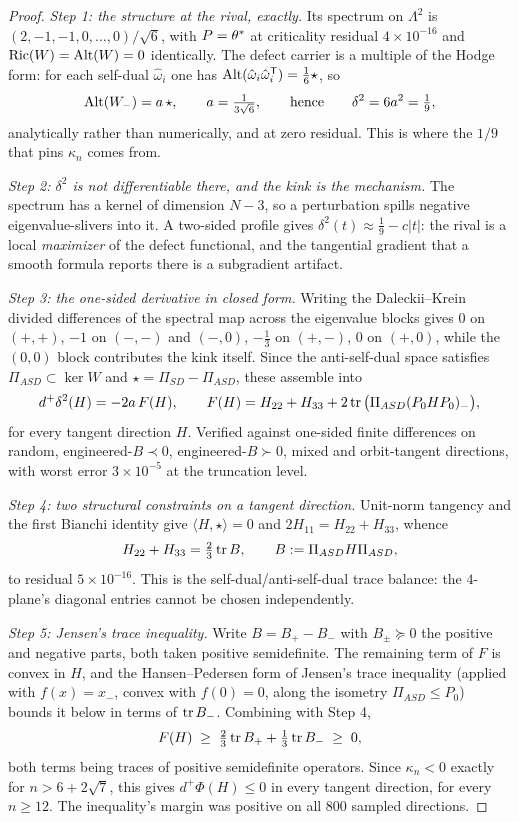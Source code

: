 \begin{proof}
\emph{Step 1: the structure at the rival, exactly.} Its spectrum on $\Lambda^2$ is $(2,-1,-1,0,\dots,0)/\sqrt6$, with $P=\theta^{*}$ at criticality residual $4\times10^{-16}$ and $\mathrm{Ric}(W)=\mathrm{Alt}(W)=0$ identically. The defect carrier is a multiple of the Hodge form: for each self-dual $\hat\omega_i$ one has $\mathrm{Alt}(\hat\omega_i\hat\omega_i^{\mathsf T})=\tfrac16\star$, so
\[
\mathrm{Alt}(W_-)=a\,\star,\qquad a=\tfrac1{3\sqrt6},\qquad\text{hence}\qquad \delta^2=6a^2=\tfrac19 ,
\]
analytically rather than numerically, and at zero residual. This is where the $1/9$ that pins $\kappa_n$ comes from.

\emph{Step 2: $\delta^2$ is not differentiable there, and the kink is the mechanism.} The spectrum has a kernel of dimension $N-3$, so a perturbation spills negative eigenvalue-slivers into it. A two-sided profile gives $\delta^2(t)\approx\tfrac19-c|t|$: the rival is a local \emph{maximizer} of the defect functional, and the tangential gradient that a smooth formula reports there is a subgradient artifact.

\emph{Step 3: the one-sided derivative in closed form.} Writing the Daleckii--Krein divided differences of the spectral map across the eigenvalue blocks gives $0$ on $(+,+)$, $-1$ on $(-,-)$ and $(-,0)$, $-\tfrac13$ on $(+,-)$, $0$ on $(+,0)$, while the $(0,0)$ block contributes the kink itself. Since the anti-self-dual space satisfies $\Pi_{ASD}\subset\ker W$ and $\star=\Pi_{SD}-\Pi_{ASD}$, these assemble into
\[
d^{+}\delta^2(H)=-2a\,F(H),\qquad F(H)=H_{22}+H_{33}+2\operatorname{tr}\big(\Pi_{ASD}(P_0HP_0)_-\big),
\]
for every tangent direction $H$. Verified against one-sided finite differences on random, engineered-$B\prec0$, engineered-$B\succ0$, mixed and orbit-tangent directions, with worst error $3\times10^{-5}$ at the truncation level.

\emph{Step 4: two structural constraints on a tangent direction.} Unit-norm tangency and the first Bianchi identity give $\langle H,\star\rangle=0$ and $2H_{11}=H_{22}+H_{33}$, whence
\[
H_{22}+H_{33}=\tfrac23\operatorname{tr} B,\qquad B:=\Pi_{ASD}H\Pi_{ASD},
\]
to residual $5\times10^{-16}$. This is the self-dual/anti-self-dual trace balance: the $4$-plane's diagonal entries cannot be chosen independently.

\emph{Step 5: Jensen's trace inequality.} Write $B=B_+-B_-$ with $B_\pm\succeq0$ the positive and negative parts, both taken positive semidefinite. The remaining term of $F$ is convex in $H$, and the Hansen--Pedersen form of Jensen's trace inequality (applied with $f(x)=x_-$, convex with $f(0)=0$, along the isometry $\Pi_{ASD}\le P_0$) bounds it below in terms of $\operatorname{tr} B_-$. Combining with Step 4,
\[
F(H)\;\ge\;\tfrac23\operatorname{tr} B_++\tfrac13\operatorname{tr} B_-\;\ge\;0 ,
\]
both terms being traces of positive semidefinite operators. Since $\kappa_n<0$ exactly for $n>6+2\sqrt7$, this gives $d^{+}\Phi(H)\le0$ in every tangent direction, for every $n\ge12$. The inequality's margin was positive on all $800$ sampled directions.


\end{proof}
